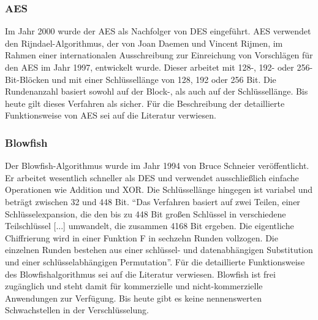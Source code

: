 \subsubsection{AES}
\label{aes}
Im Jahr 2000 wurde der \ac{AES} als Nachfolger von \ac{DES} eingeführt\cite[vgl.][Seite 90]{ling02}.
\ac{AES} verwendet den Rijndael-Algorithmus, der von Joan Daemen und Vincent Rijmen, im Rahmen einer internationalen Ausschreibung zur Einreichung von Vorschlägen für den \ac{AES} im Jahr 1997, entwickelt wurde\cite[vgl.][Seite 89]{ling02}.
Dieser arbeitet mit 128-, 192- oder 256-Bit-Blöcken und mit einer Schlüssellänge von 128, 192 oder 256 Bit\cite[vgl.][Seite 89]{ling02}.
Die Rundenanzahl basiert sowohl auf der Block-, als auch auf der Schlüssellänge.
Bis heute gilt dieses Verfahren als sicher\cite[vgl.][Seite 94]{ling02}.
Für die Beschreibung der detaillierte Funktionsweise von \ac{AES} sei auf die Literatur \cite[Seite 81 ff.]{spitz11} verwiesen.

\subsubsection{Blowfish}
\label{blowfish}
Der Blowfish-Algorithmus wurde im Jahr 1994 von Bruce Schneier veröffentlicht\cite[vgl.][Seite 96]{ling02}.
Er arbeitet wesentlich schneller als \ac{DES} und verwendet ausschließlich einfache Operationen wie Addition und XOR\cite[vgl.][Seite 96]{ling02}.
Die Schlüssellänge hingegen ist variabel und beträgt zwischen 32 und 448 Bit\cite[vgl.][Seite 96]{ling02}.
"`Das Verfahren basiert auf zwei Teilen, einer Schlüsselexpansion, die den bis zu 448 Bit großen Schlüssel in verschiedene Teilschlüssel [...] umwandelt, die zusammen 4168 Bit ergeben. Die eigentliche Chiffrierung wird in einer Funktion F in sechzehn Runden vollzogen. Die einzelnen Runden bestehen aus einer schlüssel- und datenabhängigen Substitution und einer schlüsselabhängigen Permutation"'\cite[Seite 97]{ling02}.
Für die detaillierte Funktionsweise des Blowfishalgorithmus sei auf die Literatur \cite{ling02} verwiesen.
Blowfish ist frei zugänglich und steht damit für kommerzielle und nicht-kommerzielle Anwendungen zur Verfügung.
Bis heute gibt es keine nennenswerten Schwachstellen in der Verschlüsselung\cite[vgl.][Seite 100]{ling02}.

